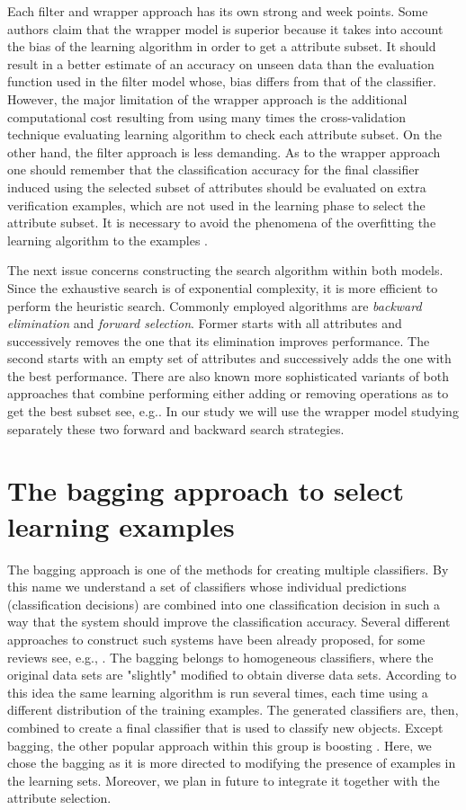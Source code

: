 \documentclass{elsart}
\begin{document}
Each filter and wrapper approach has its own strong and week points. Some
authors claim \cite{Kohavi94} that the wrapper model is superior because it
takes into account the bias of the learning algorithm in order to get a
attribute subset. It should result in a better estimate of an accuracy on
unseen data than the evaluation function used in the filter model whose,
bias differs from that of the classifier. However, the major limitation of
the wrapper approach is the additional computational cost resulting from
using many times the cross-validation technique evaluating learning
algorithm to check each attribute subset. On the other hand, the filter
approach is less demanding. As to the wrapper approach one should remember
that the classification accuracy for the final classifier induced using the
selected subset of attributes should be evaluated on extra verification
examples, which are not used in the learning phase to select the attribute
subset. It is necessary to avoid the phenomena of the overfitting the
learning algorithm to the examples \cite{Kohavi95}.

The next issue concerns constructing the search algorithm within both
models. Since the exhaustive search is of exponential complexity, it is more
efficient to perform the heuristic search. Commonly employed algorithms are
{\em backward elimination} and {\em forward selection}. Former starts with
all attributes and successively removes the one that its elimination
improves performance. The second starts with an empty set of attributes and
successively adds the one with the best performance. There are also known
more sophisticated variants of both approaches that combine performing
either adding or removing operations as to get the best subset see,
e.g.\cite{JelStefKr}. In our study we will use the wrapper model studying
separately these two forward and backward search strategies.

\section{The bagging approach to select learning examples}

The bagging approach is one of the methods for creating multiple
classifiers. By this name we understand a set of classifiers whose
individual predictions (classification decisions) are combined into one
classification decision in such a way that the system should improve the
classification accuracy. Several different approaches to construct such
systems have been already proposed, for some reviews see, e.g.,
\cite{Dietrich,Gama,valenti}. The bagging belongs to homogeneous
classifiers,  where the original data sets are "slightly" modified to obtain
diverse data sets.  According to this idea the same learning algorithm is
run several times, each time using a different distribution of the training
examples. The generated classifiers are, then, combined to create a final
classifier that is used to classify new objects. Except bagging, the other
popular approach within this group is boosting \cite{Freund}. Here, we chose
the bagging as it is more directed to modifying the presence of examples in
the learning sets. Moreover, we plan in future to integrate it together with
the attribute selection.
\end{document}
